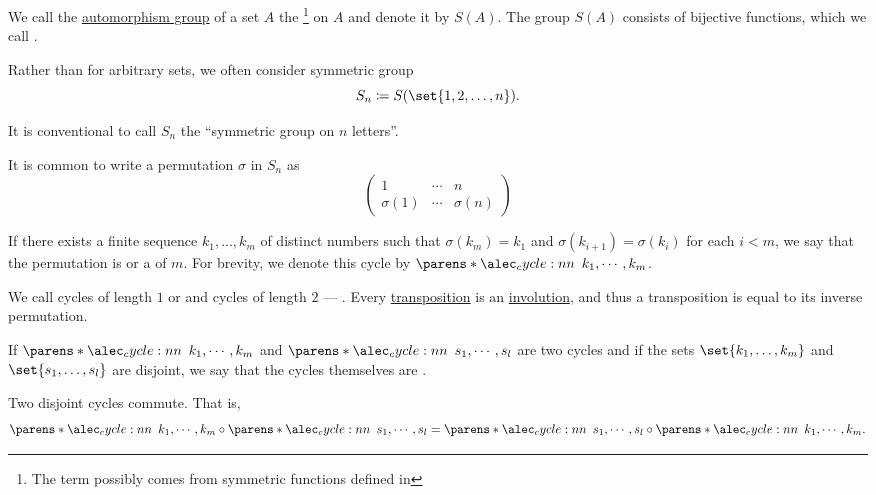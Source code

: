 \begin{definition}\label{def:symmetric_group}
  We call the \hyperref[def:automorphism_group]{automorphism group} of a set \( A \) the \footnote{The term possibly comes from symmetric functions defined in } on \( A \) and denote it by \( S(A) \). The group \( S(A) \) consists of bijective functions, which we call .

  Rather than for arbitrary sets, we often consider symmetric group
  \begin{equation*}
    S_n \coloneqq S(\set{ 1, 2, \ldots, n }).
  \end{equation*}

  It is conventional to call \( S_n \) the \enquote{symmetric group on \( n \) letters}.

  \begin{thmenum}
     It is common to write a permutation \( \sigma \) in \( S_n \) as
    \begin{equation*}
      \begin{pmatrix}
        1         & \cdots & n \\
        \sigma(1) & \cdots & \sigma(n)
      \end{pmatrix}
    \end{equation*}

     If there exists a finite sequence \( k_1, \ldots, k_m \) of distinct numbers such that \( \sigma(k_m) = k_1 \) and \( \sigma(k_{i+1}) = \sigma(k_i) \) for each \( i < m \), we say that the permutation is  or a  of  \( m \). For brevity, we denote this cycle by \( \cycle{k_1, \cdots, k_m} \).

    We call cycles of length \( 1 \)  or  and cycles of length \( 2 \) --- . Every \hyperref[def:symmetric_group/cycle]{transposition} is an \hyperref[def:set_with_involution]{involution}, and thus a transposition is equal to its inverse permutation.

     If \( \cycle{k_1, \cdots, k_m} \) and \( \cycle{s_1, \cdots, s_l} \) are two cycles and if the sets \( \set{ k_1, \ldots, k_m } \) and \( \set{ s_1, \ldots, s_l } \) are disjoint, we say that the cycles themselves are .

    Two disjoint cycles commute. That is,
    \begin{equation*}
      \cycle{k_1, \cdots, k_m} \bincirc \cycle{s_1, \cdots, s_l} = \cycle{s_1, \cdots, s_l} \bincirc \cycle{k_1, \cdots, k_m}.
    \end{equation*}
  \end{thmenum}
\end{definition}

